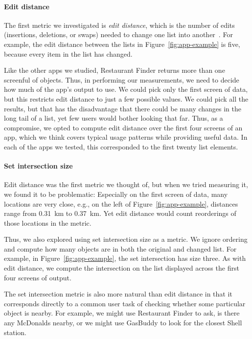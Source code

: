\documentclass[10pt, conference, compsocconf]{IEEEtran}
\begin{document}
\paragraph*{Edit distance}

The first metric we investigated is \emph{edit distance}, which is the
number of edits (insertions, deletions, or swaps) needed to change one
list into another~\cite{levenshtein:1966}. For
example, the edit distance between the lists in
Figure~\ref{fig:app-example} is five, because every item in the
list has changed.

Like the other apps we studied, Restaurant Finder returns more than
one screenful of objects. Thus, in performing our measurements, we
need to decide how much of the app's output to use. We could pick only
the first screen of data, but this restricts edit distance to just
a few possible values. We could pick all the results, but that has the
disadvantage that there could be many changes in the long tail of a
list, yet few users would bother looking that far. Thus, as a
compromise, we opted to compute edit distance over the first four
screens of an app, which we think covers typical usage patterns while
providing useful data.  In each of the apps we tested, this corresponded 
to the first twenty list elements.

\paragraph*{Set intersection size}

Edit distance was the first metric we thought of, but when we tried
measuring it, we found it to be
problematic: Especially on the first screen of data, many locations
are very close, e.g., on the left of
Figure~\ref{fig:app-example}, distances range from 0.31~km to
0.37~km. Yet edit distance would count reorderings of those locations
in the metric.

Thus, we also explored using set intersection size as a metric. We
ignore ordering and compute how many objects are in both the original
and changed list. For example, in Figure~\ref{fig:app-example}, the set
intersection has size three. As with edit distance, we compute the
intersection on the list displayed across the first four screens of
output.

The set intersection metric is also more natural than edit distance in
that it corresponds directly to a common user task of checking whether
some particular object is nearby. For example, we might use Restaurant Finder
to ask, is there any McDonalds nearby, or we might use GasBuddy to
look for the closest Shell station.
\end{document}
